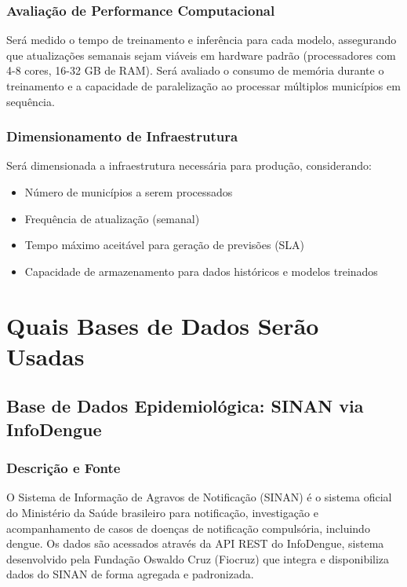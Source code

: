 \subsubsection{Avaliação de Performance Computacional}

Será medido o tempo de treinamento e inferência para cada modelo, assegurando que atualizações semanais sejam viáveis em hardware padrão (processadores com 4-8 cores, 16-32 GB de RAM). Será avaliado o consumo de memória durante o treinamento e a capacidade de paralelização ao processar múltiplos municípios em sequência.

\subsubsection{Dimensionamento de Infraestrutura}

Será dimensionada a infraestrutura necessária para produção, considerando:
\begin{itemize}
    \item Número de municípios a serem processados
    \item Frequência de atualização (semanal)
    \item Tempo máximo aceitável para geração de previsões (SLA)
    \item Capacidade de armazenamento para dados históricos e modelos treinados
\end{itemize}

\section{Quais Bases de Dados Serão Usadas}

\subsection{Base de Dados Epidemiológica: SINAN via InfoDengue}

\subsubsection{Descrição e Fonte}

O Sistema de Informação de Agravos de Notificação (SINAN) é o sistema oficial do Ministério da Saúde brasileiro para notificação, investigação e acompanhamento de casos de doenças de notificação compulsória, incluindo dengue. Os dados são acessados através da API REST do InfoDengue, sistema desenvolvido pela Fundação Oswaldo Cruz (Fiocruz) que integra e disponibiliza dados do SINAN de forma agregada e padronizada.


